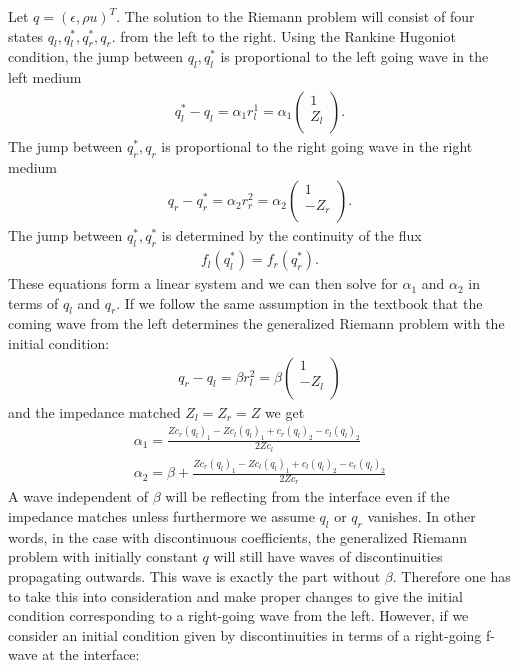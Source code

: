 \documentclass{article}
\begin{document}
Let $q=(\epsilon,\rho u)^T$. The solution to the Riemann problem will consist of four states $q_l,q_l^*,q_r^*,q_r$. from the left to the right. Using the Rankine Hugoniot condition, the jump between $q_l,q_l^*$ is proportional to the left going wave in the left medium
\begin{align}
q_l^*-q_l=\alpha_1 r^1_l=\alpha_1   \left( \begin{array}{c}
                      1 \\
                      Z_l \\
                    \end{array}\right).
\end{align}
The jump between $q_r^*,q_r$ is proportional to the right going wave in the right medium
\begin{align}
q_r-q_r^*=\alpha_2 r^2_r=\alpha_2   \left( \begin{array}{c}
                      1 \\
                      -Z_r \\
                    \end{array}\right).
\end{align}
The jump between $q_l^*,q_r^*$ is determined by the continuity of the flux
\begin{align}
f_l(q_l^*)=f_r(q_r^*).
\end{align}
These equations form a linear system and we can then solve for $\alpha_1$ and $\alpha_2$ in terms of $q_l$ and $q_r$. If we follow the same assumption in the textbook that the coming wave from the left determines the generalized Riemann problem with the initial condition:
\begin{align}
q_r-q_l=\beta r^2_l=\beta\left( \begin{array}{c}
                      1 \\
                      -Z_l \\
                    \end{array}\right)
\end{align}
and the impedance matched $Z_l=Z_r=Z$
we get
\begin{align}
\alpha_1=  \frac {Z c_r (q_l)_1 -Z c_l (q_l)_1 + c_r (q_l)_2 - c_l (q_l)_2 }{2 Z c_l}\\
\alpha_2=  \beta+\frac {Z c_r (q_l)_1 -Z c_l (q_l)_1 + c_l (q_l)_2 - c_r (q_l)_2 }{2 Z c_r}
\end{align}
A wave independent of $\beta$ will be reflecting from the interface even if the impedance matches unless furthermore we assume $q_l$ or $q_r$ vanishes. In other words, in the case with discontinuous coefficients, the generalized Riemann problem with initially constant $q$ will still have waves of discontinuities propagating outwards. This wave is exactly the part without $\beta$. Therefore one has to take this into consideration and make proper changes to give the initial condition corresponding to a right-going wave from the left. However, if we consider an initial condition given by discontinuities in terms of a right-going f-wave at the interface:
\end{document}
